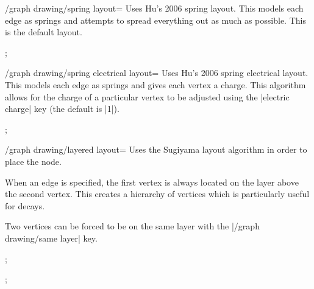 \documentclass[a4paper,final]{ltxdoc}
\begin{document}
\begin{key}{/graph drawing/spring layout=}
  Uses Hu's 2006 spring layout.  This models each edge as springs and attempts
  to spread everything out as much as possible.  This is the default layout.

\begin{codeexample}[]
;
\end{codeexample}
\end{key}

\begin{key}{/graph drawing/spring electrical layout=}
  Uses Hu's 2006 spring electrical layout.  This models each edge as springs
  and gives each vertex a charge.  This algorithm allows for the charge of a
  particular vertex to be adjusted using the |electric charge| key (the default
  is |1|).

\begin{codeexample}[]
;
\end{codeexample}
\end{key}

\begin{key}{/graph drawing/layered layout=}
  Uses the Sugiyama layout algorithm in order to place the node.

  When an edge is specified, the first vertex is always located on the layer
  above the second vertex.  This creates a hierarchy of vertices which is
  particularly useful for decays.

  Two vertices can be forced to be on the same layer with the
  |/graph drawing/same layer| key.

\begin{codeexample}[]
;
\end{codeexample}
\begin{codeexample}[]
;
\end{codeexample}
\end{key}
\end{document}
